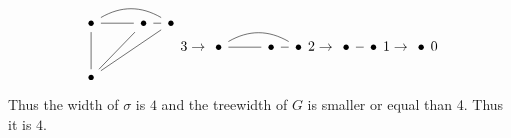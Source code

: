 \documentclass{article}
\begin{document}
\begin{solving}
    \begin{equation*}
        \begin{tikzcd}[column sep=tiny, row sep =small]
	\bullet &&&& \bullet & \bullet \\
	\\
	\\
	\bullet
	\arrow[no head, from=1-1, to=1-5]
	\arrow[no head, from=1-5, to=1-6]
	\arrow[no head, from=1-1, to=4-1]
	\arrow[ no head, from=4-1, to=1-6]
	\arrow[bend left, no head, from=1-1, to=1-6]
	\arrow[no head, from=1-5, to=4-1]
\end{tikzcd} 3\to 
\begin{tikzcd}[column sep=tiny, row sep =small]
	\bullet &&&& \bullet & \bullet
	\arrow[no head, from=1-1, to=1-5]
	\arrow[no head, from=1-5, to=1-6]
	\arrow[bend left, no head, from=1-1, to=1-6]
\end{tikzcd} 2\to \begin{tikzcd}[column sep=tiny, row sep =small]
	\bullet & \bullet
	\arrow[no head, from=1-1, to=1-2]
\end{tikzcd} 1 \to \begin{tikzcd}[column sep=tiny, row sep =small]
	\bullet 
\end{tikzcd} 0
    \end{equation*}
    Thus the width of $\sigma$ is $4$ and the treewidth of $G$ is smaller or equal than 4. Thus it is $4$.
\end{solving}
\newpage
\end{document}
